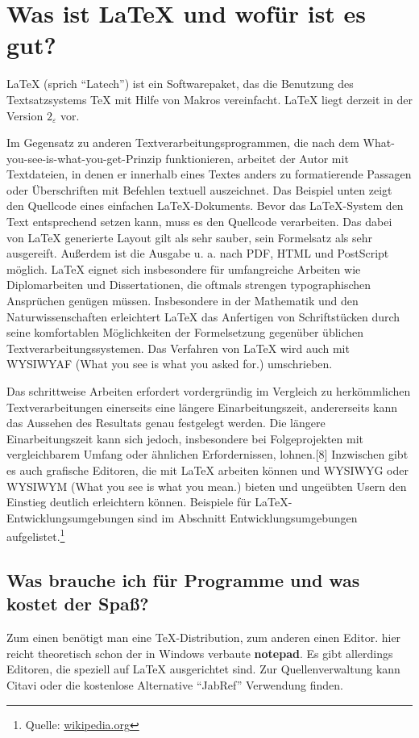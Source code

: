 \section{Was ist LaTeX und wofür ist es gut?
	\label{sec:latex}}
{\LaTeX} (sprich "`Latech"') ist ein Softwarepaket, das die Benutzung des Textsatzsystems TeX mit Hilfe von Makros vereinfacht. LaTeX liegt derzeit in der Version $2_\varepsilon$ vor.

Im Gegensatz zu anderen Textverarbeitungsprogrammen, die nach dem What-you-see-is-what-you-get-Prinzip funktionieren, arbeitet der Autor mit Textdateien, in denen er innerhalb eines Textes anders zu formatierende Passagen oder Überschriften mit Befehlen textuell auszeichnet. Das Beispiel unten zeigt den Quellcode eines einfachen LaTeX-Dokuments. Bevor das LaTeX-System den Text entsprechend setzen kann, muss es den Quellcode verarbeiten. Das dabei von LaTeX generierte Layout gilt als sehr sauber, sein Formelsatz als sehr ausgereift. Außerdem ist die Ausgabe u. a. nach PDF, HTML und PostScript möglich. LaTeX eignet sich insbesondere für umfangreiche Arbeiten wie Diplomarbeiten und Dissertationen, die oftmals strengen typographischen Ansprüchen genügen müssen. Insbesondere in der Mathematik und den Naturwissenschaften erleichtert LaTeX das Anfertigen von Schriftstücken durch seine komfortablen Möglichkeiten der Formelsetzung gegenüber üblichen Textverarbeitungssystemen. Das Verfahren von LaTeX wird auch mit WYSIWYAF (What you see is what you asked for.) umschrieben.

Das schrittweise Arbeiten erfordert vordergründig im Vergleich zu herkömmlichen Textverarbeitungen einerseits eine längere Einarbeitungszeit, andererseits kann das Aussehen des Resultats genau festgelegt werden. Die längere Einarbeitungszeit kann sich jedoch, insbesondere bei Folgeprojekten mit vergleichbarem Umfang oder ähnlichen Erfordernissen, lohnen.[8] Inzwischen gibt es auch grafische Editoren, die mit LaTeX arbeiten können und WYSIWYG oder WYSIWYM (What you see is what you mean.) bieten und ungeübten Usern den Einstieg deutlich erleichtern können. Beispiele für LaTeX-Entwicklungsumgebungen sind im Abschnitt Entwicklungsumgebungen aufgelistet.\footnote{Quelle: \href{https://de.wikipedia.org/wiki/LaTeX}{wikipedia.org}}

\clearpage

\subsection{Was brauche ich für Programme und was kostet der Spaß?
	\label{sec:latex_programme}}
Zum einen benötigt man eine TeX-Distribution, zum anderen einen Editor. hier reicht theoretisch schon der in Windows verbaute \textbf{notepad}. Es gibt allerdings Editoren, die speziell auf {\LaTeX} ausgerichtet sind. Zur Quellenverwaltung kann Citavi oder die kostenlose Alternative "`JabRef"' Verwendung finden.

